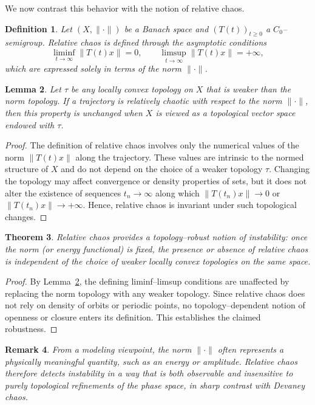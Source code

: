 \documentclass[12pt]{article}
\newtheorem{theorem}{Theorem}[section]
\newtheorem{lemma}[theorem]{Lemma}
\newtheorem{definition}[theorem]{Definition}
\newtheorem{remark}[theorem]{Remark}
\begin{document}
We now contrast this behavior with the notion of relative chaos.

\begin{definition}
Let $(X,\|\cdot\|)$ be a Banach space and $(T(t))_{t\ge 0}$ a $C_0$--semigroup. Relative chaos is defined through the asymptotic conditions
\[
\liminf_{t\to\infty}\|T(t)x\|=0,
\qquad
\limsup_{t\to\infty}\|T(t)x\|=+\infty,
\]
which are expressed solely in terms of the norm $\|\cdot\|$.
\end{definition}

\begin{lemma}\label{lem:topology_independence}
Let $\tau$ be any locally convex topology on $X$ that is weaker than the norm topology. If a trajectory is relatively chaotic with respect to the norm $\|\cdot\|$, then this property is unchanged when $X$ is viewed as a topological vector space endowed with $\tau$.
\end{lemma}

\begin{proof}
The definition of relative chaos involves only the numerical values of the norm $\|T(t)x\|$ along the trajectory. These values are intrinsic to the normed structure of $X$ and do not depend on the choice of a weaker topology $\tau$. Changing the topology may affect convergence or density properties of sets, but it does not alter the existence of sequences $t_n\to\infty$ along which $\|T(t_n)x\|\to 0$ or $\|T(t_n)x\|\to+\infty$. Hence, relative chaos is invariant under such topological changes.
\end{proof}

\begin{theorem}\label{thm:relative_remedy}
Relative chaos provides a topology--robust notion of instability: once the norm (or energy functional) is fixed, the presence or absence of relative chaos is independent of the choice of weaker locally convex topologies on the same space.
\end{theorem}

\begin{proof}
By Lemma~\ref{lem:topology_independence}, the defining liminf--limsup conditions are unaffected by replacing the norm topology with any weaker topology. Since relative chaos does not rely on density of orbits or periodic points, no topology--dependent notion of openness or closure enters its definition. This establishes the claimed robustness.
\end{proof}

\begin{remark}
From a modeling viewpoint, the norm $\|\cdot\|$ often represents a physically meaningful quantity, such as an energy or amplitude. Relative chaos therefore detects instability in a way that is both observable and insensitive to purely topological refinements of the phase space, in sharp contrast with Devaney chaos.
\end{remark}
\end{document}
